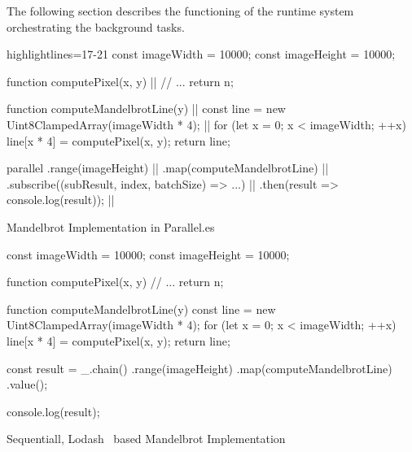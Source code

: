  The following section describes the functioning of the runtime system orchestrating the background tasks.
 
\begin{listing}
	\begin{javascriptcode*}{highlightlines={17-21}}
const imageWidth = 10000;
const imageHeight = 10000;

function computePixel(x, y) { |$\label{code:mandelbrot-compute-pixel}$|
	// ...
	return n;
}

function computeMandelbrotLine(y) { |$\label{code:parallel-es-operation}$|
	const line = new Uint8ClampedArray(imageWidth * 4); |$\label{code:mandelbrot-reference1-imageWidth}$|
	for (let x = 0; x < imageWidth; ++x) {
		line[x * 4] = computePixel(x, y);
	}
	return line;
}

parallel
	.range(imageHeight) |$\label{code:parallel-es-definition-start}$|
	.map(computeMandelbrotLine)	 |$\label{code:parallel-es-map}$|
	.subscribe((subResult, index, batchSize) => ...) |$\label{code:parallel-es-subscribe}$|
	.then(result => console.log(result)); |$\label{code:parallel-es-start}$|
	\end{javascriptcode*}
	
	\caption{Mandelbrot Implementation in Parallel.es}
	\label{code:mandelbrot-parallel.es}
\end{listing}


\begin{listing}
	
	\begin{javascriptcode}
const imageWidth = 10000;
const imageHeight = 10000;

function computePixel(x, y) {
	// ...
	return n;
}

function computeMandelbrotLine(y) {
	const line = new Uint8ClampedArray(imageWidth * 4);
	for (let x = 0; x < imageWidth; ++x) {
		line[x * 4] = computePixel(x, y);
	}
	return line;
}

const result = _.chain()
	.range(imageHeight)
	.map(computeMandelbrotLine)
	.value();
	
console.log(result);
\end{javascriptcode}
\caption{Sequentiall, Lodash~\cite{lodash} based Mandelbrot Implementation}
\label{fig:mandelbrot-sync}
\end{listing}